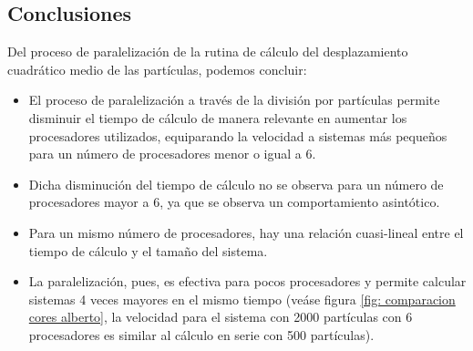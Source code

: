 \documentclass[onecolumn]{article}
\begin{document}
\subsection{Conclusiones}
Del proceso de paralelización de la rutina de cálculo del desplazamiento cuadrático medio de las partículas, podemos concluir:
\begin{itemize}
\item El proceso de paralelización a través de la división por partículas permite disminuir el tiempo de cálculo de manera relevante en aumentar los procesadores utilizados, equiparando la velocidad a sistemas más pequeños para un número de procesadores menor o igual a 6.
\item Dicha disminución del tiempo de cálculo no se observa para un número de procesadores mayor a 6, ya que se observa un comportamiento asintótico.
\item Para un mismo número de procesadores, hay una relación cuasi-lineal entre el tiempo de cálculo y el tamaño del sistema.
\item La paralelización, pues, es efectiva para pocos procesadores y permite calcular sistemas 4 veces mayores en el mismo tiempo (veáse figura \ref{fig: comparacion cores alberto}, la velocidad para el sistema con 2000 partículas con 6 procesadores es similar al cálculo en serie con 500 partículas). 
\end{itemize}
\end{document}
